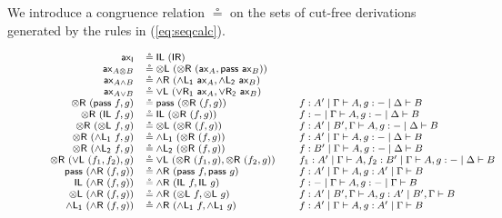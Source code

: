 \documentclass[submission,copyright,creativecommons]{eptcs}
\theoremstyle{definition}
\newcommand{\tl}{\otimes \mathsf{L}}
\newcommand{\tr}{\otimes \mathsf{R}}
\newcommand{\pass}{\mathsf{pass}}
\newcommand{\unitl}{\mathsf{IL}}
\newcommand{\unitr}{\mathsf{IR}}
\newcommand{\andlone}{\land \mathsf{L_{1}}}
\newcommand{\andltwo}{\land \mathsf{L_{2}}}
\newcommand{\andr}{\land \mathsf{R}}
\newcommand{\orl}{\lor \mathsf{L}}
\newcommand{\orrone}{\lor \mathsf{R_{1}}}
\newcommand{\orrtwo}{\lor \mathsf{R_{2}}}
\newcommand{\ax}{\mathsf{ax}}
\newcommand{\ot}{\otimes}
\newcommand{\I}{\mathsf{I}}
\begin{document}
We introduce a congruence relation $\circeq$ on the sets of cut-free derivations generated by the rules in (\ref{eq:seqcalc}). 
\begin{figure}[t]
  \begin{equation}
  \label{fig:circeq}
  \footnotesize
  \begin{array}{rlll}
    \ax_{\I} &\circeq \unitl \text{ } (\unitr)
    \\
    \ax_{A \ot B} &\circeq \tl \text{ } (\tr \text{ } (\ax_{A} , \pass \text{ } \ax_{B}))
    \\
    \ax_{A \land B} &\circeq \andr \ (\andlone \ \ax_A , \andltwo \ \ax_B)
    \\
    \ax_{A \lor B} &\circeq \orl \ (\orrone \ \ax_A , \orrtwo \ \ax_B)
    \\
    \tr \text{ } (\pass \text{ } f, g) &\circeq \pass \text{ } (\tr \text{ } (f, g)) &&f : A' \mid \Gamma \vdash A, g : {-} \mid \Delta \vdash B
    \\
    \tr \text{ } (\unitl \text{ } f, g) &\circeq \unitl \text{ } (\tr \text{ } (f , g)) &&f : {-} \mid \Gamma \vdash A , g : {-} \mid \Delta \vdash B
    \\
    \tr \text{ } (\tl \text{ } f, g) &\circeq \tl \text{ } (\tr \text{ } (f , g)) &&f : A' \mid B' , \Gamma \vdash A , g : {-} \mid \Delta \vdash B
    \\
    \tr \ (\andlone \ f , g) &\circeq \andlone \ (\tr \ (f , g)) &&f : A' \mid \Gamma \vdash A, g : - \mid \Delta \vdash B
    \\
    \tr \ (\andltwo \ f , g) &\circeq \andltwo \ (\tr \ (f , g)) &&f : B' \mid \Gamma \vdash A, g : - \mid \Delta \vdash B
    \\
    \tr \ (\orl \ (f_1 , f_2) , g) &\circeq \orl \ (\tr \ (f_1 , g) , \tr \ (f_2 , g)) &&f_1 : A' \mid \Gamma \vdash A , f_2 : B' \mid \Gamma \vdash A , g : - \mid \Delta \vdash B
    \\
    \pass \ (\andr \ (f , g)) &\circeq  \andr \ (\pass \ f , \pass \ g) &&f : A' \mid \Gamma \vdash A , g : A' \mid \Gamma \vdash B
    \\
    \unitl \ (\andr \ (f , g)) &\circeq  \andr \ (\unitl \ f , \unitl \ g) &&f : - \mid \Gamma \vdash A , g : - \mid \Gamma \vdash B
    \\
    \tl \ (\andr \ (f , g)) &\circeq  \andr \ (\tl \ f , \tl \ g) &&f : A' \mid B' , \Gamma \vdash A , g : A' \mid B' , \Gamma \vdash B
    \\
    \andlone \ (\andr \ (f , g)) &\circeq  \andr \ (\andlone \ f , \andlone \ g) &&f : A' \mid \Gamma \vdash A , g : A' \mid \Gamma \vdash B

\end{array}
\end{equation}
\end{figure}
\end{document}
